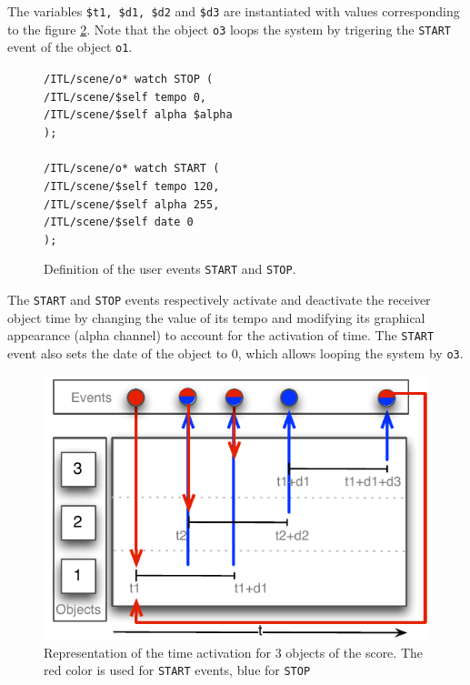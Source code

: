 \documentclass{article}
\newcommand{\OSC}[1]	{{\fontsize{9pt}{9pt} \selectfont\texttt{#1}}}
\newcommand{\tab}{\hspace*{4mm}}
\newcommand{\sample}[1]		{\vspace{-0.2em}\begin{center}\colorbox{mygrey}{\begin{minipage}[t]{0.98\columnwidth} {\small \texttt{#1}}\end{minipage}}\end{center}}
\begin{document}
The variables \OSC{\$t1, \$d1, \$d2} and \OSC{\$d3} are instantiated with values corresponding to the figure \ref{fig:sample}. Note that the object \OSC{o3} loops the system by trigering the \OSC{START} event of the object \OSC{o1}.

\begin{figure}[h]
   \centering
\sample{/ITL/scene/o* watch STOP ( \\
   \tab/ITL/scene/\$self tempo 0,\\
   \tab/ITL/scene/\$self alpha \$alpha	\\
);\\
\\
/ITL/scene/o* watch START ( \\
   \tab/ITL/scene/\$self tempo 120,\\
   \tab/ITL/scene/\$self alpha 255,\\
   \tab/ITL/scene/\$self date 0\\
);
}
   \caption{Definition of the user events \OSC{START} and \OSC{STOP}.}
   \label{fig:ex2}
\end{figure}

The \OSC{START} and \OSC{STOP} events respectively activate and deactivate the receiver object time by changing the value of its tempo and modifying its graphical appearance (alpha channel) to account for the activation of time. The \OSC{START} event also sets the date of the object to 0, which allows looping the system by \OSC{o3}.
\begin{figure}[h]
   \centering
   \includegraphics[width=0.8\columnwidth]{imgs/sample}
   \caption{Representation of the time activation for 3 objects of the score. The red color is used for \OSC{START} events, blue for \OSC{STOP}}
   \label{fig:sample}
\end{figure}


\end{document}
